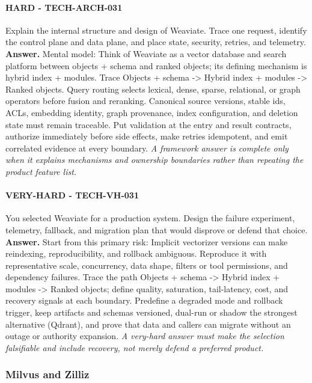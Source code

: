 \paragraph{HARD - TECH-ARCH-031} Explain the internal structure and design of Weaviate. Trace one request, identify the control plane and data plane, and place state, security, retries, and telemetry.
\textbf{Answer.} Mental model: Think of Weaviate as a vector database and search platform between objects + schema and ranked objects; its defining mechanism is hybrid index + modules. Trace Objects + schema -> Hybrid index + modules -> Ranked objects. Query routing selects lexical, dense, sparse, relational, or graph operators before fusion and reranking. Canonical source versions, stable ids, ACLs, embedding identity, graph provenance, index configuration, and deletion state must remain traceable. Put validation at the entry and result contracts, authorize immediately before side effects, make retries idempotent, and emit correlated evidence at every boundary.
\textit{A framework answer is complete only when it explains mechanisms and ownership boundaries rather than repeating the product feature list.}
\paragraph{VERY-HARD - TECH-VH-031} You selected Weaviate for a production system. Design the failure experiment, telemetry, fallback, and migration plan that would disprove or defend that choice.
\textbf{Answer.} Start from this primary risk: Implicit vectorizer versions can make reindexing, reproducibility, and rollback ambiguous. Reproduce it with representative scale, concurrency, data shape, filters or tool permissions, and dependency failures. Trace the path Objects + schema -> Hybrid index + modules -> Ranked objects; define quality, saturation, tail-latency, cost, and recovery signals at each boundary. Predefine a degraded mode and rollback trigger, keep artifacts and schemas versioned, dual-run or shadow the strongest alternative (Qdrant), and prove that data and callers can migrate without an outage or authority expansion.
\textit{A very-hard answer must make the selection falsifiable and include recovery, not merely defend a preferred product.}
\subsubsection*{Milvus and Zilliz}
